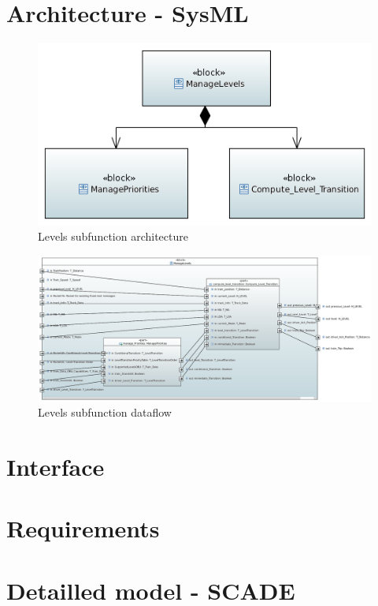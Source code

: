 

\section{Architecture - SysML}


\begin{landscape}

\begin{figure}[hbtp]
\centering
\includegraphics[scale=1]{../SysML/FunctionalArchi_Levels.png}
\caption{Levels subfunction architecture}
\end{figure}
\end{landscape}


\begin{landscape}
\begin{figure}[hbtp]
\centering
\includegraphics[scale=0.6]{../SysML/ManageLevels.png}
\caption{Levels subfunction dataflow}
\end{figure}
\end{landscape}

\section{Interface}

\section{Requirements}

\section{Detailled model - SCADE}


